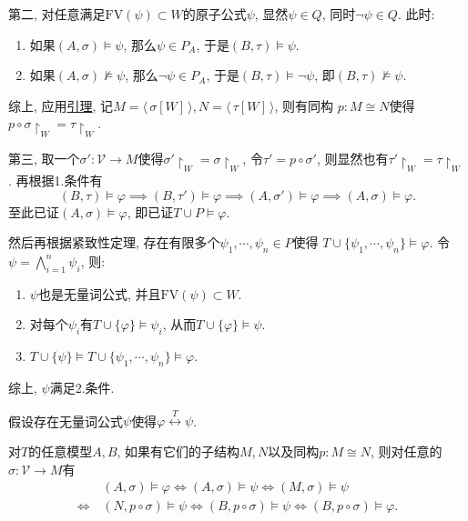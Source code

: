 \documentclass[UTF8]{ctexart}
\begin{document}
第二, 对任意满足$\mathrm{FV}(\psi)\subset W$的原子公式$\psi$,
显然$\psi\in Q$, 同时$\neg\psi\in Q$. 此时:
\begin{enumerate}
    \item 如果$(A,\sigma)\models\psi$, 那么$\psi\in P_A$, 于是$(B,\tau)\models\psi$.
    \item 如果$(A,\sigma)\not\models\psi$, 那么$\neg\psi\in P_A$,
    于是$(B,\tau)\models\neg\psi$, 即$(B,\tau)\not\models\psi$.
\end{enumerate}
综上, 应用\href{../01 一阶语言的结构/04 生成子结构#nameddest=sec:定理1.4}{引理},
记$M=\langle\,\sigma[W]\,\rangle,N=\langle\,\tau[W]\,\rangle$, 则有同构
$p:M\cong N$使得$p\circ\sigma\!\restriction_W=\tau\!\restriction_W$.

第三, 取一个$\sigma':\mathcal{V}\to M$使得$\sigma'\!\restriction_W=\sigma\!\restriction_W$,
令$\tau'=p\circ\sigma'$, 则显然也有$\tau'\!\restriction_W=\tau\!\restriction_W$. 再根据1.条件有
\[
    (B,\tau)\models\varphi\implies(B,\tau')\models\varphi\implies
    (A,\sigma')\models\varphi\implies(A,\sigma)\models\varphi.
\]
至此已证$(A,\sigma)\models\varphi$, 即已证$T\cup P\models\varphi$.

然后再根据紧致性定理, 存在有限多个$\psi_1,\cdots,\psi_n\in P$使得
$T\cup\{\psi_1,\cdots,\psi_n\}\models\varphi$.
令$\displaystyle\psi=\bigwedge_{i=1}^n\psi_i$, 则:
\begin{enumerate}
    \item $\psi$也是无量词公式, 并且$\mathrm{FV}(\psi)\subset W$.
    \item 对每个$\psi_i$有$T\cup\{\varphi\}\models\psi_i$,
    从而$T\cup\{\varphi\}\models\psi$.
    \item $T\cup\{\psi\}\models T\cup\{\psi_1,\cdots,\psi_n\}\models\varphi$.
\end{enumerate}
综上, $\psi$满足2.条件.


假设存在无量词公式$\psi$使得$\varphi\overset{T}{\leftrightarrow}\psi$.

对$T$的任意模型$A,B$, 如果有它们的子结构$M,N$以及同构$p:M\cong N$,
则对任意的$\sigma:\mathcal{V}\to M$有
\begin{equation*}\begin{aligned}
    &(A,\sigma)\models\varphi\iff(A,\sigma)\models\psi\iff
    (M,\sigma)\models\psi\\[-3pt]
    \iff\,&(N,p\circ\sigma)\models\psi\iff(B,p\circ\sigma)\models\psi\iff
    (B,p\circ\sigma)\models\varphi.
\end{aligned}\tag*{\qedsymbol}\end{equation*}
\end{document}
